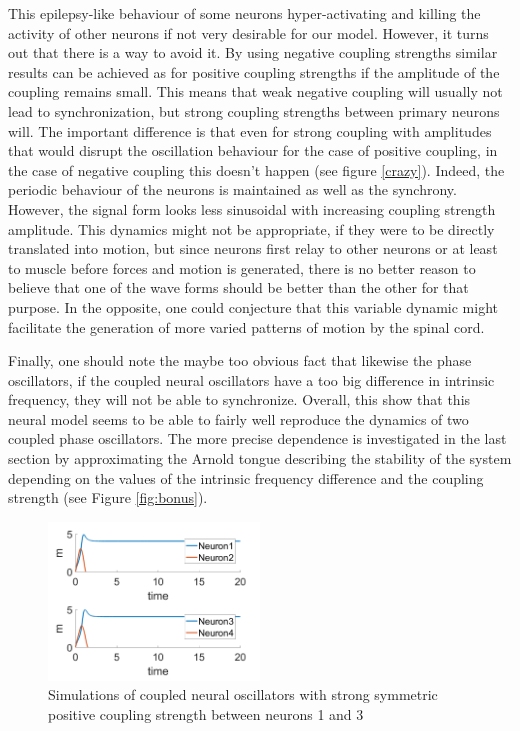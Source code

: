 \documentclass[a4paper]{scrartcl}
\begin{document}
This epilepsy-like behaviour of some neurons hyper-activating and killing the activity of other neurons if not very desirable for our model. However, it turns out that there is a way to avoid it. By using negative coupling strengths similar results can be achieved as for positive coupling strengths if the amplitude of the coupling remains small. This means that weak negative coupling will usually not lead to synchronization, but strong coupling strengths between primary neurons will. The important difference is that even for strong coupling with amplitudes that would disrupt the oscillation behaviour for the case of positive coupling, in the case of negative coupling this doesn't happen (see figure \ref{crazy}). Indeed, the periodic behaviour of the neurons is maintained as well as the synchrony. However, the signal form looks less sinusoidal with increasing coupling strength amplitude. This dynamics might not be appropriate, if they were to be directly translated into motion, but since neurons first relay to other neurons or at least to muscle before forces and motion is generated, there is no better reason to believe that one of the wave forms should be better than the other for that purpose. In the opposite, one could conjecture that this variable dynamic might facilitate the generation of more varied patterns of motion by the spinal cord. 

Finally, one should note the maybe too obvious fact that likewise the phase oscillators, if the coupled neural oscillators have a too big difference in intrinsic frequency, they will not be able to synchronize. Overall, this show that this neural model seems to be able to fairly well reproduce the dynamics of two coupled phase oscillators. The more precise dependence is investigated in the last section by approximating the Arnold tongue describing the stability of the system depending on the values of the intrinsic frequency difference and the coupling strength (see Figure \ref{fig:bonus}).

\begin{figure}[!h]
	\centering
	\includegraphics[width=0.5\textwidth]{fig/kill.png}
	\caption{Simulations of coupled neural oscillators with strong symmetric positive coupling strength between neurons 1 and 3}\label{kill}
\end{figure}
\end{document}
